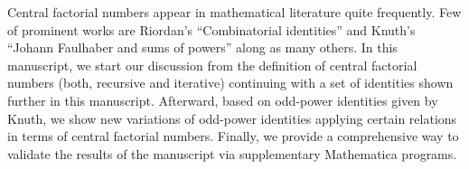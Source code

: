 Central factorial numbers appear in mathematical literature quite frequently.
Few of prominent works are Riordan's ``Combinatorial identities'' and Knuth's ``Johann Faulhaber and sums of powers''
along as many others.
In this manuscript, we start our discussion from the definition of central factorial numbers (both, recursive and iterative)
continuing with a set of identities shown further in this manuscript.
Afterward, based on odd-power identities given by Knuth,
we show new variations of odd-power identities applying certain relations in terms of central factorial numbers.
Finally, we provide a comprehensive way to validate the results of the manuscript via supplementary Mathematica programs.

